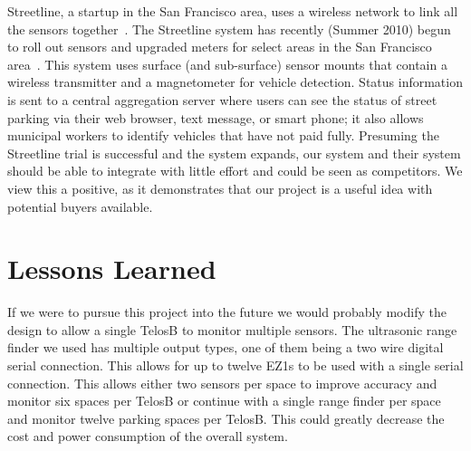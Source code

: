 \documentclass{acm_proc}
\begin{document}
Streetline, a startup in the San Francisco area, uses a wireless network to
link all the sensors together~\cite{pgi:streetline}.
The Streetline system has recently (Summer 2010) begun to roll out sensors
and upgraded meters for select areas in the San Francisco
area~\cite{wired:streetline, sfpark}.
This system uses surface (and sub-surface) sensor mounts that contain a
wireless transmitter and a magnetometer for vehicle detection.
Status information is sent to a central aggregation server where users can
see the status of street parking via their web browser, text message, or
smart phone; it also allows municipal workers to identify vehicles that
have not paid fully.
Presuming the Streetline trial is successful and the system expands, our
system and their system should be able to integrate with little effort and
could be seen as competitors.
We view this a positive, as it demonstrates that our project is a useful
idea with potential buyers available.


\section{Lessons Learned}\label{sec:lessons}

If we were to pursue this project into the future we would probably modify
the design to allow a single TelosB to monitor multiple sensors.  The
ultrasonic range finder we used has multiple output types, one of them
being a two wire digital serial connection.
This allows for up to twelve EZ1s to be used with a single serial
connection.
This allows either two sensors per space to improve accuracy and monitor
six spaces per TelosB or continue with a single range finder per space and
monitor twelve parking spaces per TelosB.
This could greatly decrease the cost and power consumption of the overall
system.
\end{document}
